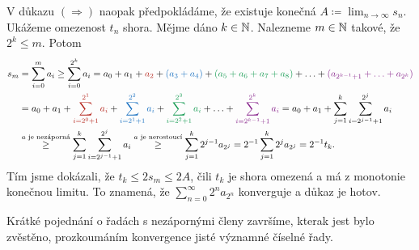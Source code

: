 \begin{thmproof}
 V důkazu $( \Rightarrow )$ naopak předpokládáme, že existuje konečná $A
 \coloneqq \lim_{n \to \infty} s_n$. Ukážeme omezenost $t_n$ shora. Mějme dáno
 $k \in \mathbb{N}$. Nalezneme $m \in \mathbb{N}$ takové, že $2^{k} \leq m$. Potom
 \begin{align*}
  s_m &= \sum_{i=0}^{m} a_i \geq \sum_{i=0}^{2^{k}} a_i = a_0 + a_1 + \clr{a_2}
  + \clb{(a_3 + a_4)} + \clg{(a_5 + a_6 + a_7 + a_8)} + \ldots +
  \clm{(a_{2^{k-1}+1}+\ldots+a_{2^{k}})}\\
      &= a_0 + a_1 + \clr{\sum_{i=2^{0}+1}^{2^1} a_i} +
      \clb{\sum_{i=2^1+1}^{2^2} a_i} + \clg{\sum_{i=2^2+1}^{2^3} a_i} + \ldots +
      \clm{\sum_{i=2^{k-1}+1}^{2^{k}} a_i} = a_0 + a_1 + \sum_{j=1}^{k}
      \sum_{i=2^{j-1}+1}^{2^{j}} a_i\\
      & \overset{\text{$a$ je nezáporná}}{ \geq } \sum_{j=1}^k
      \sum_{i=2^{j-1}+1}^{2^{j}} a_i \overset{\text{$a$ je nerostoucí}}{ \geq }
      \sum_{j=1}^k 2^{j-1}a_{2^{j}} = 2^{-1} \sum_{j=1}^k 2^{j}a_{2^{j}} =
      2^{-1}t_k.
 \end{align*}
 Tím jsme dokázali, že $t_k \leq 2s_m \leq 2A$, čili $t_k$ je shora omezená a
 má z monotonie konečnou limitu. To znamená, že $\sum_{n=0}^{\infty}
 2^{n}a_{2^{n}}$ konverguje a důkaz je hotov.
\end{thmproof}

Krátké pojednání o řadách s nezápornými členy završíme, kterak jest bylo
zvěstěno, prozkoumáním konvergence jisté významné číselné řady.


